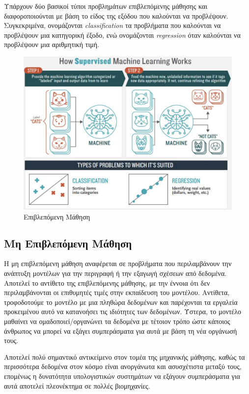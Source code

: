 \medskip
Υπάρχουν δύο βασικοί τύποι προβλημάτων επιβλεπόμενης μάθησης και διαφοροποιούνται με βάση το είδος της εξόδου που καλούνται να προβλέψουν. Συγκεκριμένα, ονομάζονται \textit{classification} τα προβλήματα που καλούνται να προβλέψουν μια κατηγορική έξοδο, ενώ ονομάζονται \textit{regression} όταν καλούνται να προβλέψουν μια αριθμητική τιμή.

\medskip
\begin{figure}[h]
  \centering
  \includegraphics[scale=0.3]{images/suplearn.png}
  \caption{Επιβλεπόμενη Μάθηση}
  \label{fig:suplearn}
\end{figure}

\subsection{Μη Επιβλεπόμενη Μάθηση}

Η μη επιβλεπόμενη μάθηση αναφέρεται σε προβλήματα που περιλαμβάνουν την ανάπτυξη μοντέλων για την περιγραφή ή την εξαγωγή σχέσεων από δεδομένα. Αποτελεί το αντίθετο της επιβλεπόμενης μάθησης, με την έννοια ότι δεν περιλαμβάνονται οι επιθυμητές τιμές στην εκπαίδευση του μοντέλου. Αντίθετα, τροφοδοτούμε το μοντέλο με μια πληθώρα δεδομένων και παρέχονται τα εργαλεία προκειμένου αυτό να κατανοήσει τις ιδιότητες των δεδομένων. Ύστερα, το μοντέλο μαθαίνει να ομαδοποιεί/οργανώνει τα δεδομένα με τέτοιον τρόπο ώστε κάποιος άνθρωπος να μπορεί να εξάγει συμπεράσματα για αυτά με βάση τη νέα οργάνωσή τους.

\medskip
Αποτελεί πολύ σημαντικό αντικείμενο στον τομέα της μηχανικής μάθησης, καθώς τα περισσότερα δεδομένα στον κόσμο είναι ανοργάνωτα και ασυσχέτιστα μεταξύ τους, επομένως η δυνατότητα υπολογιστικών συστημάτων να εξάγουν συμπεράσματα για αυτά αποτελεί πλεονέκτημα σε πολλές βιομηχανίες.

